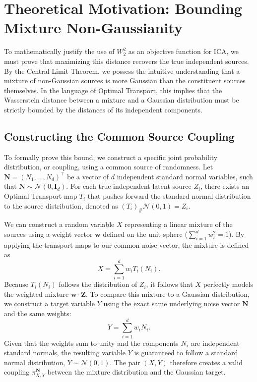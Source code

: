 \documentclass[12pt,a4paper,twoside,openany]{book}
\begin{document}
\section{Theoretical Motivation: Bounding Mixture Non-Gaussianity}
To mathematically justify the use of $W_2^2$ as an objective function for ICA, we must prove that maximizing this distance 
recovers the true independent sources. By the Central Limit Theorem, we possess the intuitive understanding that a mixture of 
non-Gaussian sources is more Gaussian than the constituent sources themselves. In the language of Optimal Transport, this implies 
that the Wasserstein distance between a mixture and a Gaussian distribution must be strictly bounded by the distances of its independent components. 


\subsection{Constructing the Common Source Coupling}
To formally prove this bound, we construct a specific joint probability distribution, or coupling, using a common source of randomness. 
Let $\mathbf{N} = (N_1, \dots, N_d)^\top$ be a vector of $d$ independent standard normal variables, such that $\mathbf{N} \sim \mathcal{N}(0, \mathbf{I}_d)$. 
For each true independent latent source $Z_i$, there exists an Optimal Transport map $T_i$ that pushes forward the standard normal distribution 
to the source distribution, denoted as $(T_i)_{\#} \mathcal{N}(0,1) = Z_i$. 

We can construct a random variable $X$ representing a linear mixture of the sources using a weight vector $\mathbf{w}$ defined on the 
unit sphere ($\sum_{i=1}^d w_i^2 = 1$). By applying the transport maps to our common noise vector, the mixture is defined as
\begin{equation}
    X = \sum_{i=1}^d w_i T_i(N_i).
\end{equation}
Because $T_i(N_i)$ follows the distribution of $Z_i$, it follows that $X$ perfectly models the weighted mixture $\mathbf{w} \cdot \mathbf{Z}$. 
To compare this mixture to a Gaussian distribution, we construct a target variable $Y$ using the exact same underlying noise vector $\mathbf{N}$ and the same weights:
\begin{equation}
    Y = \sum_{i=1}^d w_i N_i.
\end{equation}
Given that the weights sum to unity and the components $N_i$ are independent standard normals, the resulting variable $Y$ is guaranteed to follow 
a standard normal distribution, $Y \sim \mathcal{N}(0,1)$. The pair $(X, Y)$ therefore creates a valid coupling $\pi_{X,Y}^{\mathbf{N}}$ 
between the mixture distribution and the Gaussian target.
\end{document}

